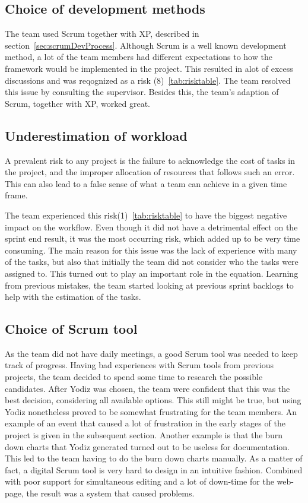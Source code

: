 \subsection{Choice of development methods}

The team used Scrum together with XP, described in section~\ref{sec:scrumDevProcess}. Although Scrum is a well known development method, a lot of the team members had different expectations to how the framework would be implemented in the project. This resulted in alot of excess discussions and was reqognized as a risk (8)~\ref{tab:risktable}. The team resolved this issue by consulting the supervisor. Besides this, the team's adaption of Scrum, together with XP, worked great. 

\subsection{Underestimation of workload}
A prevalent risk to any project is the failure to acknowledge the cost of tasks in the project, and the improper allocation of resources that follows such an error. This can also lead to a false sense of what a team can achieve in a given time frame. 

The team experienced this risk(1)~\ref{tab:risktable} to have the biggest negative impact on the workflow. Even though it did not have a detrimental effect on the sprint end result, it was the most occurring risk, which added up to be very time consuming. The main reason for this issue was the lack of experience with many of the tasks, but also that initially the team did not consider who the tasks were assigned to. This turned out to play an important role in the equation. Learning from previous mistakes, the team started looking at previous sprint backlogs to help with the estimation of the tasks.

\subsection{Choice of Scrum tool}
\label{sec:choiceScrumTool}
As the team did not have daily meetings, a good Scrum tool was needed to keep track of progress. Having bad experiences with Scrum tools from previous projects, the team decided to spend some time to research the possible candidates. After Yodiz was chosen, the team were confident that this was the best decision, considering all available options. This still might be true, but using Yodiz nonetheless proved to be somewhat frustrating for the team members. An example of an event that caused a lot of frustration in the early stages of the project is given in the subsequent section. Another example is that the burn down charts that Yodiz generated turned out to be useless for documentation. This led to the team having to do the burn down charts manually. As a matter of fact, a digital Scrum tool is very hard to design in an intuitive fashion. Combined with poor support for simultaneous editing and a lot of down-time for the web-page, the result was a system that caused problems. 

